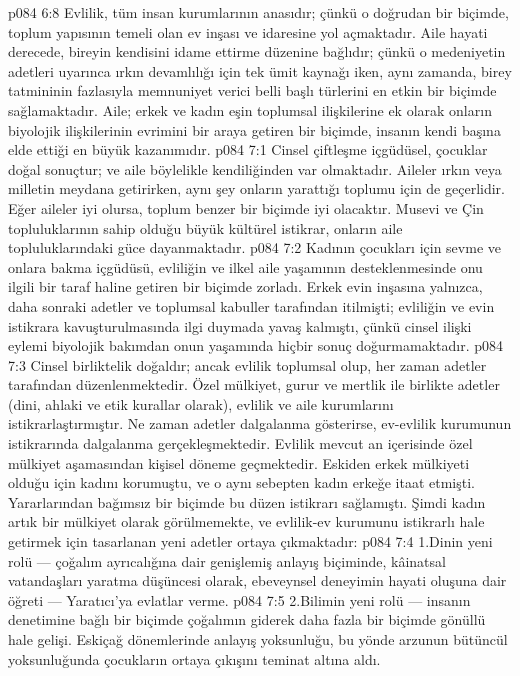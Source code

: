 \vs p084 6:8 Evlilik, tüm insan kurumlarının anasıdır; çünkü o doğrudan bir biçimde, toplum yapısının temeli olan ev inşası ve idaresine yol açmaktadır. Aile hayati derecede, bireyin kendisini idame ettirme düzenine bağlıdır; çünkü o medeniyetin adetleri uyarınca ırkın devamlılığı için tek ümit kaynağı iken, aynı zamanda, birey tatmininin fazlasıyla memnuniyet verici belli başlı türlerini en etkin bir biçimde sağlamaktadır. Aile; erkek ve kadın eşin toplumsal ilişkilerine ek olarak onların biyolojik ilişkilerinin evrimini bir araya getiren bir biçimde, insanın kendi başına elde ettiği en büyük kazanımıdır.
\vs p084 7:1 Cinsel çiftleşme içgüdüsel, çocuklar doğal sonuçtur; ve aile böylelikle kendiliğinden var olmaktadır. Aileler ırkın veya milletin meydana getirirken, aynı şey onların yarattığı toplumu için de geçerlidir. Eğer aileler iyi olursa, toplum benzer bir biçimde iyi olacaktır. Musevi ve Çin topluluklarının sahip olduğu büyük kültürel istikrar, onların aile topluluklarındaki güce dayanmaktadır.
\vs p084 7:2 Kadının çocukları için sevme ve onlara bakma içgüdüsü, evliliğin ve ilkel aile yaşamının desteklenmesinde onu ilgili bir taraf haline getiren bir biçimde zorladı. Erkek evin inşasına yalnızca, daha sonraki adetler ve toplumsal kabuller tarafından itilmişti; evliliğin ve evin istikrara kavuşturulmasında ilgi duymada yavaş kalmıştı, çünkü cinsel ilişki eylemi biyolojik bakımdan onun yaşamında hiçbir sonuç doğurmamaktadır.
\vs p084 7:3 Cinsel birliktelik doğaldır; ancak evlilik toplumsal olup, her zaman adetler tarafından düzenlenmektedir. Özel mülkiyet, gurur ve mertlik ile birlikte adetler (dini, ahlaki ve etik kurallar olarak), evlilik ve aile kurumlarını istikrarlaştırmıştır. Ne zaman adetler dalgalanma gösterirse, ev\hyp{}evlilik kurumunun istikrarında dalgalanma gerçekleşmektedir. Evlilik mevcut an içerisinde özel mülkiyet aşamasından kişisel döneme geçmektedir. Eskiden erkek mülkiyeti olduğu için kadını korumuştu, ve o aynı sebepten kadın erkeğe itaat etmişti. Yararlarından bağımsız bir biçimde bu düzen istikrarı sağlamıştı. Şimdi kadın artık bir mülkiyet olarak görülmemekte, ve evlilik\hyp{}ev kurumunu istikrarlı hale getirmek için tasarlanan yeni adetler ortaya çıkmaktadır:
\vs p084 7:4 1.\bibnobreakspace Dinin yeni rolü --- çoğalım ayrıcalığına dair genişlemiş anlayış biçiminde, kâinatsal vatandaşları yaratma düşüncesi olarak, ebeveynsel deneyimin hayati oluşuna dair öğreti --- Yaratıcı’ya evlatlar verme.
\vs p084 7:5 2.\bibnobreakspace Bilimin yeni rolü --- insanın denetimine bağlı bir biçimde çoğalımın giderek daha fazla bir biçimde gönüllü hale gelişi. Eskiçağ dönemlerinde anlayış yoksunluğu, bu yönde arzunun bütüncül yoksunluğunda çocukların ortaya çıkışını teminat altına aldı.
